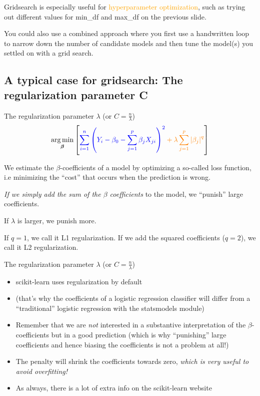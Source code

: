\documentclass[compress]{beamer}
\begin{document}
\begin{frame}[standout]
Gridsearch is especially useful for \textcolor{orange}{hyperparameter optimization}, such as trying out different values for min\_df and max\_df on the previous slide.

You could also use a combined approach where you first use a handwritten loop to narrow down the number of candidate models and then tune the model(s) you settled on with a grid search.
\end{frame}


\subsection{A typical case for gridsearch: The regularization parameter C}


\begin{frame}{The regularization parameter $\lambda$ (or $C = \frac{n}{\lambda}$)}
$$
\underset{\boldsymbol{\beta}}{\arg \min }\left[\color{blue} \sum_{i=1}^{n}\left(Y_{i}-\beta_{0}-\sum_{j=1}^{p} \beta_{j} X_{j i}\right)^{2}\color{orange} +\lambda \sum_{j=1}^{p}\left|\beta_{j}\right|^{q} \color{black} \right]
$$

\color{blue}We estimate the $\beta$-coefficients of a model by optimizing a so-called loss function, i.e minimizing the ``cost'' that occurs when the prediction is wrong.

\color{orange} \emph{If we simply add the sum of the $\beta$ coefficients} to the model, we ``punish'' large coefficients.
\color{black}
\pause

If $\lambda$ is larger, we punish more.

\tiny{If $q=1$, we call it L1 regularization. If we add the squared coefficients ($q=2$), we call it L2 regularization.}
\end{frame}



\begin{frame}{The regularization parameter $\lambda$ (or $C = \frac{n}{\lambda}$)}
\begin{itemize}[<+->]
	\item scikit-learn uses regularization by default
	\item (that's why the coefficients of a logistic regression classifier will differ from a ``traditional'' logistic regression with the statsmodels module)
	\item Remember that we are \textit{not} interested in a substantive interpretation of the  $\beta$-coefficients but in a good prediction (which is why ``punishing'' large coefficients and hence biasing the coefficients is not a problem at all!)
	\item The penalty will shrink the coefficients towards zero, \emph{which is very useful to avoid overfitting!}
	\item As always, there is a lot of extra info on the scikit-learn website
\end{itemize}
\end{frame}
\end{document}
